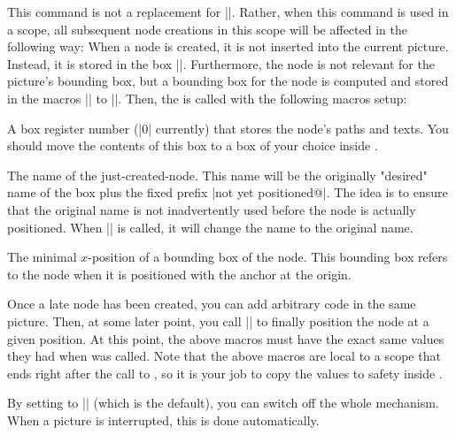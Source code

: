 \begin{command}{\pgfpositionnodelater{}}
  This command is not a replacement for |\pgfnode|. Rather, when this
  command is used in a scope, all subsequent node creations in this
  scope will be affected in the following way:  When a node is
  created, it is not inserted into the current picture. Instead, it
  is stored in the box |\pgfpositionnodelaterbox|. Furthermore, the
  node is not relevant for the picture's bounding box, but a bounding
  box for the node is computed and stored in the macros
  |\pgfpositionnodelaterminx| to |\pgfpositionnodelatermaxy|. Then,
  the  is called with the following macros setup:

  \begin{command}{\pgfpositionnodelaterbox}
    A box register number (|0| currently) that stores the node's paths
    and texts. You should move the contents of this box to a box of
    your choice inside .
  \end{command}

  \begin{command}{\pgfpositionnodelatername}
    The name of the just-created-node. This name will be the
    originally "desired" name of the box plus the fixed prefix
    |not yet positioned@|. The idea is to ensure that the original
    name is not inadvertently used before the node is actually
    positioned. When |\pgfpositionnodenow| is called, it will change
    the name to the original name.
  \end{command}

  \begin{command}{\pgfpositionnodelaterminx}
    The minimal $x$-position of a bounding box of the node. This
    bounding box refers to the node when it is positioned with the
    anchor at the origin.
  \end{command}
  \begin{command}{\pgfpositionnodelaterminy}
  \end{command}
  \begin{command}{\pgfpositionnodelatermaxx}
  \end{command}
  \begin{command}{\pgfpositionnodelatermaxy}
  \end{command}

  Once a late node has been created, you can add arbitrary code in the
  same picture. Then, at some later point, you call
  |\pgfpositionnodenow| to finally position the node at a given
  position.  At this point, the above macros must have the exact same
  values they had when  was called. Note that the
  above macros are local to a scope that ends right after the call to
  , so it is your job to copy the values to safety
  inside .

  By setting  to |\relax| (which is the default), you
  can switch off the whole mechanism. When a picture is interrupted,
  this is done automatically.
\end{command}


